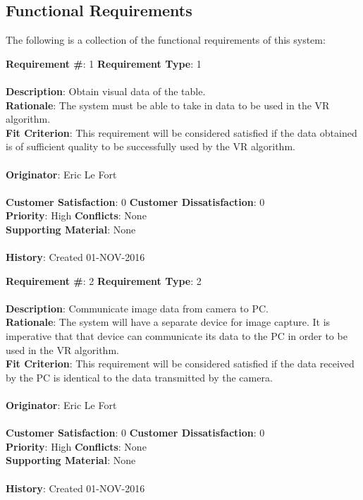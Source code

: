 \documentclass[titlepage]{article}
\begin{document}
\subsection{Functional Requirements}
The following is a collection of the functional requirements of this system:
\begin{framed}
	\noindent\textbf{Requirement \#}: 1 \hfill \textbf{Requirement Type}: 1 \hfill\\\\
	\noindent\textbf{Description}: Obtain visual data of the table.\\
	\textbf{Rationale}: The system must be able to take in data to be used in the VR algorithm.\\
	\textbf{Fit Criterion}: This requirement will be considered satisfied if the data obtained is of sufficient quality to be successfully used by the VR algorithm.\\\\
	\textbf{Originator}: Eric Le Fort\\\\
	\noindent\textbf{Customer Satisfaction}: 0 \hfill 	\textbf{Customer Dissatisfaction}: 0 \hfill\\
	\textbf{Priority}: High \hfill \textbf{Conflicts}: None \hfill 		\\
	\textbf{Supporting Material}: None\\\\
	\noindent\textbf{History}: Created 01-NOV-2016
\end{framed}

\begin{framed}
	\noindent\textbf{Requirement \#}: 2 \hfill \textbf{Requirement Type}: 2 \hfill\\\\
	\noindent\textbf{Description}: Communicate image data from camera to PC.\\
	\textbf{Rationale}: The system will have a separate device for image capture. It is imperative that that device can communicate its data to the PC in order to be used in the VR algorithm.\\
	\textbf{Fit Criterion}: This requirement will be considered satisfied if the data received by the PC is identical to the data transmitted by the camera.\\\\
	\textbf{Originator}: Eric Le Fort\\\\
	\noindent\textbf{Customer Satisfaction}: 0 \hfill 	\textbf{Customer Dissatisfaction}: 0 \hfill\\
	\textbf{Priority}: High \hfill \textbf{Conflicts}: None \hfill\\
	\textbf{Supporting Material}: None\\\\
	\noindent\textbf{History}: Created 01-NOV-2016
\end{framed}
\end{document}
